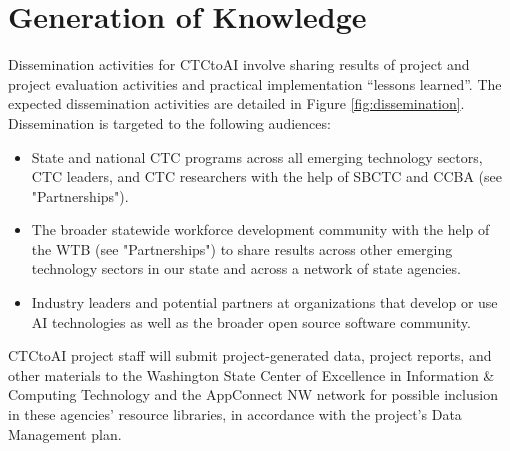 \section{Generation of Knowledge}

Dissemination activities for CTCtoAI involve sharing results of project and project evaluation activities and practical implementation ``lessons learned''. The expected dissemination activities are detailed in Figure \ref{fig:dissemination}. Dissemination is targeted to the following audiences:

\begin{itemize}
    \item State and national CTC programs across all emerging technology sectors, CTC leaders, and CTC researchers with the help of SBCTC and CCBA (see "Partnerships").
    \item The broader statewide workforce development community with the help of the WTB (see "Partnerships") to share results across other emerging technology sectors in our state and across a network of state agencies.
    \item Industry leaders and potential partners at organizations that develop or use AI technologies as well as the broader open source software community.
\end{itemize}



CTCtoAI project staff will submit project-generated data, project reports, and other materials to the Washington State Center of Excellence in Information \& Computing Technology and the AppConnect NW network for possible inclusion in these agencies’ resource libraries, in accordance with the project’s Data Management plan.